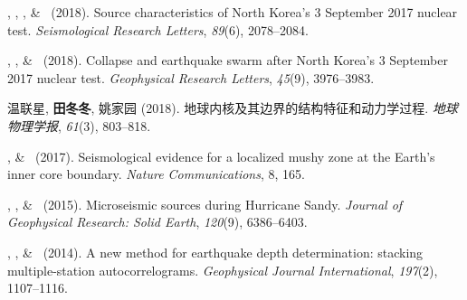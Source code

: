 \begin{etaremune}
\item
    \JYao\CF\CS, \Me\CF, \LSun, \& \LWen\ (2018).
    Source characteristics of North Korea's 3 September 2017 nuclear test.
    \emph{Seismological Research Letters}, \emph{89}(6), 2078--2084.
\item
    \Me\CF\CS, \JYao\CF, \& \LWen\ (2018).
    Collapse and earthquake swarm after North Korea's 3 September 2017 nuclear test.
    \emph{Geophysical Research Letters}, \emph{45}(9), 3976--3983.
\item
    温联星\CS, \textbf{田冬冬}, 姚家园 (2018).
    地球内核及其边界的结构特征和动力学过程.
    \emph{地球物理学报}, \emph{61}(3), 803--818.
\item
    \Me, \& \LWen\CS\ (2017).
    Seismological evidence for a localized mushy zone at the Earth's inner core boundary.
    \emph{Nature Communications}, 8, 165.
\item
    \XChen\CS, \Me, \& \LWen\ (2015).
    Microseismic sources during Hurricane Sandy.
    \emph{Journal of Geophysical Research: Solid Earth}, \emph{120}(9), 6386--6403.
\item \MZhang\CS, \Me, \& \LWen\ (2014).
    A new method for earthquake depth determination: stacking multiple-station autocorrelograms.
    \emph{Geophysical Journal International}, \emph{197}(2), 1107--1116.
\end{etaremune}


